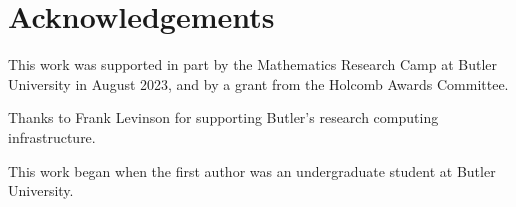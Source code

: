 \documentclass[11pt]{amsart}
\newcommand{\p}[1]{\left(#1\right)}
\numberwithin{equation}{section}
\numberwithin{algorithm}{section}
\begin{document}






%
%

\nocite{OSS2024,Moser63,TWS2022,RS62,OEIS}
\nocite{GHR,Reif}\nocite{Knuthv3}

\section{Acknowledgements}
This work was supported in part by the Mathematics Research Camp at
  Butler University in August 2023,
  and by a grant from the Holcomb Awards Committee.

Thanks to Frank Levinson for supporting Butler's research computing infrastructure.

This work began when the first author was an undergraduate student
  at Butler University.
\end{document}
